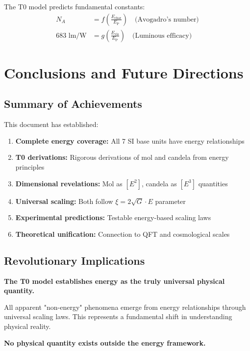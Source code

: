 \documentclass[12pt,a4paper]{article}
\newcommand{\xipar}{\xi}
\newcommand{\EP}{E_{\text{P}}}
\newcommand{\Echar}{E_{\text{char}}}
\newcommand{\Evis}{E_{\text{vis}}}
\begin{document}
	The T0 model predicts fundamental constants:
	\begin{align}
		N_A &= f\left(\frac{\Echar}{\EP}\right) \quad \text{(Avogadro's number)} \\
		683 \text{ lm/W} &= g\left(\frac{\Evis}{\EP}\right) \quad \text{(Luminous efficacy)}
	\end{align}
	
	\section{Conclusions and Future Directions}
	\label{sec:conclusions}
	
	\subsection{Summary of Achievements}
	\label{subsec:summary_achievements}
	
	This document has established:
	
	\begin{enumerate}
		\item \textbf{Complete energy coverage:} All 7 SI base units have energy relationships
		\item \textbf{T0 derivations:} Rigorous derivations of mol and candela from energy principles
		\item \textbf{Dimensional revelations:} Mol as $[E^2]$, candela as $[E^3]$ quantities
		\item \textbf{Universal scaling:} Both follow $\xipar = 2\sqrt{G} \cdot E$ parameter
		\item \textbf{Experimental predictions:} Testable energy-based scaling laws
		\item \textbf{Theoretical unification:} Connection to QFT and cosmological scales
	\end{enumerate}
	
	\subsection{Revolutionary Implications}
	\label{subsec:revolutionary_implications}
	
	\begin{tcolorbox}[colback=red!5!white,colframe=red!75!black,title=Paradigm Shift: Universal Energy Physics]
		\textbf{The T0 model establishes energy as the truly universal physical quantity.}
		
		All apparent "non-energy" phenomena emerge from energy relationships through universal scaling laws. This represents a fundamental shift in understanding physical reality.
		
		\textbf{No physical quantity exists outside the energy framework.}
	\end{tcolorbox}
	
\end{document}
